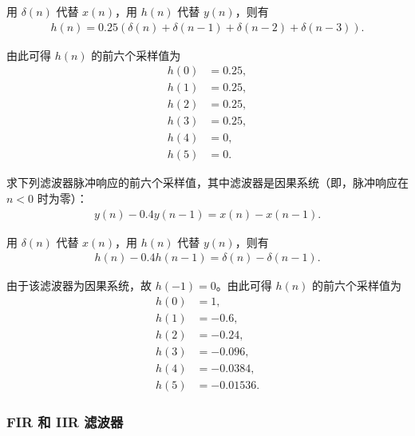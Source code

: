 \begin{solution}
    用 $\delta(n)$ 代替 $x(n)$，用 $h(n)$ 代替 $y(n)$，则有
    \begin{align*}
        h(n) = 0.25(\delta(n) + \delta(n - 1) + \delta(n - 2) + \delta(n - 3)).
    \end{align*}

    由此可得 $h(n)$ 的前六个采样值为
    \begin{align*}
        h(0) & = 0.25, \\
        h(1) & = 0.25, \\
        h(2) & = 0.25, \\
        h(3) & = 0.25, \\
        h(4) & = 0, \\
        h(5) & = 0.
    \end{align*}
\end{solution}

\begin{exercise}
    求下列滤波器脉冲响应的前六个采样值，其中滤波器是因果系统（即，脉冲响应在 $n < 0$ 时为零）：
    \begin{align*}
        y(n) - 0.4y(n - 1) = x(n) - x(n - 1).
    \end{align*}
\end{exercise}

\begin{solution}
    用 $\delta(n)$ 代替 $x(n)$，用 $h(n)$ 代替 $y(n)$，则有
    \begin{align*}
        h(n) - 0.4h(n - 1) = \delta(n) - \delta(n - 1).
    \end{align*}

    由于该滤波器为因果系统，故 $h(-1) = 0$。由此可得 $h(n)$ 的前六个采样值为
    \begin{align*}
        h(0) & = 1, \\
        h(1) & = -0.6, \\
        h(2) & = -0.24, \\
        h(3) & = -0.096, \\
        h(4) & = -0.0384, \\
        h(5) & = -0.01536.
    \end{align*}
\end{solution}

\subsubsection{FIR 和 IIR 滤波器}

